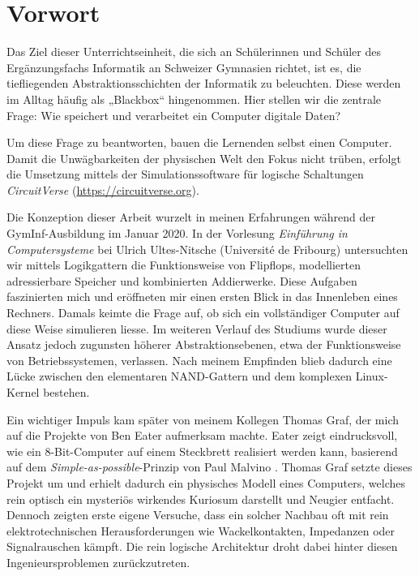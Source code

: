 \section*{Vorwort}

Das Ziel dieser Unterrichtseinheit, die sich an Schülerinnen und Schüler des Ergänzungsfachs Informatik an Schweizer Gymnasien richtet, ist es, die tiefliegenden Abstraktionsschichten der Informatik zu beleuchten. Diese werden im Alltag häufig als „Blackbox“ hingenommen. Hier stellen wir die zentrale Frage: Wie speichert und verarbeitet ein Computer digitale Daten?

Um diese Frage zu beantworten, bauen die Lernenden selbst einen Computer. Damit die Unwägbarkeiten der physischen Welt den Fokus nicht trüben, erfolgt die Umsetzung mittels der Simulationssoftware für logische Schaltungen \textit{CircuitVerse} (\url{https://circuitverse.org}).

Die Konzeption dieser Arbeit wurzelt in meinen Erfahrungen während der GymInf-Ausbildung im Januar 2020. In der Vorlesung \textit{Einführung in Computersysteme} bei Ulrich Ultes-Nitsche (Université de Fribourg) untersuchten wir mittels Logikgattern die Funktionsweise von Flipflops, modellierten adressierbare Speicher und kombinierten Addierwerke. Diese Aufgaben faszinierten mich und eröffneten mir einen ersten Blick in das Innenleben eines Rechners. Damals keimte die Frage auf, ob sich ein vollständiger Computer auf diese Weise simulieren liesse. Im weiteren Verlauf des Studiums wurde dieser Ansatz jedoch zugunsten höherer Abstraktionsebenen, etwa der Funktionsweise von Betriebssystemen, verlassen. Nach meinem Empfinden blieb dadurch eine Lücke zwischen den elementaren NAND-Gattern und dem komplexen Linux-Kernel bestehen.

Ein wichtiger Impuls kam später von meinem Kollegen Thomas Graf, der mich auf die Projekte von Ben Eater \cite{ben-eater} aufmerksam machte. Eater zeigt eindrucksvoll, wie ein 8-Bit-Computer auf einem Steckbrett realisiert werden kann, basierend auf dem \textit{Simple-as-possible}-Prinzip von Paul Malvino \cite{malvino}. Thomas Graf setzte dieses Projekt um und erhielt dadurch ein physisches Modell eines Computers, welches rein optisch ein mysteriös wirkendes Kuriosum darstellt und Neugier entfacht. Dennoch zeigten erste eigene Versuche, dass ein solcher Nachbau oft mit rein elektrotechnischen Herausforderungen wie Wackelkontakten, Impedanzen oder Signalrauschen kämpft. Die rein logische Architektur droht dabei hinter diesen Ingenieursproblemen zurückzutreten.

